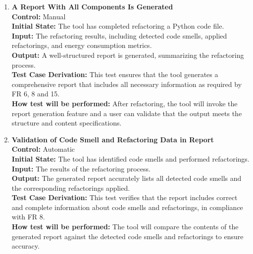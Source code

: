 \documentclass[12pt, titlepage]{article}
\begin{document}
\begin{enumerate}[label={\bf
    \textcolor{Maroon}{test-FR-RP-\arabic*}}, wide=0pt, font=\itshape]
  \item \textbf{A Report With All Components Is Generated}\\[2mm]
    \textbf{Control:} Manual \\
    \textbf{Initial State:} The tool has completed refactoring a
    Python code file.\\
    \textbf{Input:} The refactoring results, including detected code
    smells, applied refactorings, and energy consumption metrics.\\
    \textbf{Output:} A well-structured report is generated,
    summarizing the refactoring process.\\[2mm]
    \textbf{Test Case Derivation:} This test ensures that the tool
    generates a comprehensive report that includes all necessary
    information as required by FR 6, 8 and 15.\\[2mm]
    \textbf{How test will be performed:} After refactoring, the tool
    will invoke the report generation feature and a user can validate
    that the output meets the structure and content specifications.

  \item \textbf{Validation of Code Smell and Refactoring Data in Report}\\[2mm]
    \textbf{Control:} Automatic \\
    \textbf{Initial State:} The tool has identified code smells and
    performed refactorings.\\
    \textbf{Input:} The results of the refactoring process.\\
    \textbf{Output:} The generated report accurately lists all
    detected code smells and the corresponding refactorings applied.\\[2mm]
    \textbf{Test Case Derivation:} This test verifies that the report
    includes correct and complete information about code smells and
    refactorings, in compliance with FR 8.\\[2mm]
    \textbf{How test will be performed:} The tool will compare the
    contents of the generated report against the detected code smells
    and refactorings to ensure accuracy.


\end{enumerate}
\end{document}
